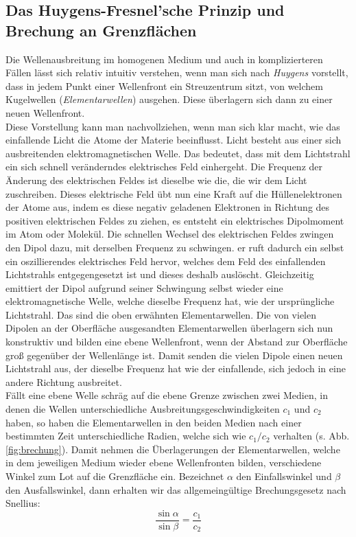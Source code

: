 \subsection{Das Huygens-Fresnel'sche Prinzip und Brechung an Grenzflächen}

Die Wellenausbreitung im homogenen Medium und auch in komplizierteren Fällen lässt sich relativ intuitiv verstehen, wenn man sich nach \textit{Huygens} vorstellt, dass in jedem Punkt einer Wellenfront ein Streuzentrum sitzt, von welchem Kugelwellen (\textit{Elementarwellen}) ausgehen. Diese überlagern sich dann zu einer neuen Wellenfront.\\

\noindent
Diese Vorstellung kann man nachvollziehen, wenn man sich klar macht, wie das einfallende Licht die Atome der Materie beeinflusst. Licht besteht aus einer sich ausbreitenden elektromagnetischen Welle. Das bedeutet, dass mit dem Lichtstrahl ein sich schnell veränderndes elektrisches Feld einhergeht. Die Frequenz der Änderung des elektrischen Feldes ist dieselbe wie die, die wir dem Licht zuschreiben. Dieses elektrische Feld übt nun eine Kraft auf die Hüllenelektronen der Atome aus, indem es diese negativ geladenen Elektronen in Richtung des positiven elektrischen Feldes zu ziehen, es entsteht ein elektrisches Dipolmoment im Atom oder Molekül. Die schnellen Wechsel des elektrischen Feldes zwingen den Dipol dazu, mit derselben Frequenz zu schwingen. er ruft dadurch ein selbst ein oszillierendes elektrisches Feld hervor, welches dem Feld des einfallenden Lichtstrahls entgegengesetzt ist und dieses deshalb auslöscht. Gleichzeitig emittiert der Dipol aufgrund seiner Schwingung selbst wieder eine elektromagnetische Welle, welche dieselbe Frequenz hat, wie der ursprüngliche Lichtstrahl. Das sind die oben erwähnten Elementarwellen. Die von vielen Dipolen an der Oberfläche ausgesandten Elementarwellen überlagern sich nun konstruktiv und bilden eine ebene Wellenfront, wenn der Abstand zur Oberfläche groß gegenüber der Wellenlänge ist. Damit senden die vielen Dipole einen neuen Lichtstrahl aus, der dieselbe Frequenz hat wie der einfallende, sich jedoch in eine andere Richtung ausbreitet.\\

\noindent
Fällt eine ebene Welle schräg auf die ebene Grenze zwischen zwei Medien, in denen die Wellen unterschiedliche Ausbreitungsgeschwindigkeiten $c_1$ und $c_2$ haben, so haben die Elementarwellen in den beiden Medien nach einer bestimmten Zeit unterschiedliche Radien, welche sich wie $c_1/c_2$ verhalten (s. Abb. \ref{fig:brechung}). Damit nehmen die Überlagerungen der Elementarwellen, welche in dem jeweiligen Medium wieder ebene Wellenfronten bilden, verschiedene Winkel zum Lot auf die Grenzfläche ein. Bezeichnet $\alpha$ den Einfallswinkel und $\beta$ den Ausfallswinkel, dann erhalten wir das allgemeingültige Brechungsgesetz nach Snellius:
\begin{equation} \label{eq:Brechungsgesetz}
\frac{\sin\alpha}{\sin\beta} = \frac{c_1}{c_2}
\end{equation}

